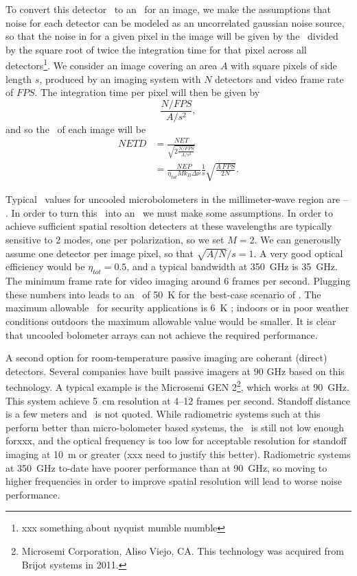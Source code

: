 To convert this detector \NET\ to an \NETD\ for an image, we make the assumptions that noise for each detector can be modeled as an uncorrelated gaussian noise source, so that the noise in for a given pixel in the image will be given by the \NET\ divided by the square root of twice the integration time for that pixel across all detectors\footnote{%
  xxx something about nyquist mumble mumble
}. 
We consider an image covering an area $A$ with square pixels of side length $s$, produced by an imaging system with $N$ detectors and video frame rate of $FPS$.
The integration time per pixel will then be given by
\begin{equation}
  \frac{N / FPS}{A / s^2},
\end{equation}
and so the \NETD\ of each image will be
\begin{align}
  NETD & = \frac{NET}{\sqrt{ 2 \frac{N / FPS}{A / s^2}}} \\
       & = \frac{NEP}{\eta_{tot} M k_B \Delta \nu} \frac{1}{s} \sqrt{\frac{A\,FPS}{2 N}} .
       \label{eqn:ch1-netd-defn}
\end{align}

Typical \NEP\ values for uncooled microbolometers in the millimeter-wave region are -- \cite{that military report}.
In order to turn this \NEP\ into an \NETD\ we must make some assumptions.
In order to achieve sufficient spatial resoltion detecters at these wavelengths are typically sensitive to 2 modes, one per polarization, so we set $M = 2$.
We can generouslly assume one detector per image pixel, so that $\sqrt{A/N}/s = 1$.
A very good optical efficiency would be $\eta_{tot} = 0.5$, and a typical bandwidth at \SI{350}{\GHz} is \SI{35}{\GHz}.
The minimum frame rate for video imaging around 6 frames per second.
Plugging these numbers into  leads to an \NETD\ of \SI{50}{\K} for the best-case scenario of  \NEP.
The maximum allowable \NETD\ for security applications is \SI{6}{\K} \cite{military}; indoors or in poor weather conditions outdoors the maximum allowable value would be smaller.
It is clear that uncooled bolometer arrays can not achieve the required performance.

A second option for room-temperature passive imaging are coherant (direct) detectors. 
Several companies have built passive imagers at 90 GHz based on this technology.
A typical example is the Microsemi GEN 2\footnote{%
Microsemi Corporation, Aliso Viejo, CA. This technology was acquired from Brijot systems in 2011.}, which works at \SI{90}{\GHz}.
This system achieve \SI{5}{\cm} resolution at 4--12 frames per second.
Standoff distance is a few meters and \NETD\ is not quoted.
While radiometric systems such at this perform better than micro-bolometer based systems, the \NETD\ is still not low enough forxxx, and the optical frequency is too low for acceptable resolution for standoff imaging at \SI{10}{\m} or greater (xxx need to justify this better).
Radiometric systems at \SI{350}{\GHz} to-date have poorer performance than at \SI{90}{\GHz}, so moving to higher frequencies in order to improve spatial resolution will lead to worse noise performance.

